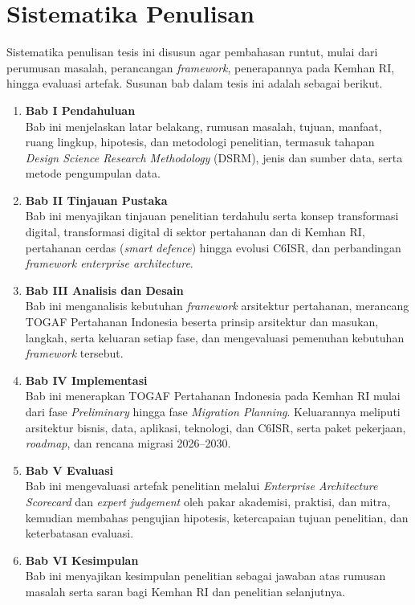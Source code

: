 \section{Sistematika Penulisan}
Sistematika penulisan tesis ini disusun agar pembahasan runtut, mulai dari perumusan masalah, perancangan \textit{framework}, penerapannya pada Kemhan RI, hingga evaluasi artefak.
Susunan bab dalam tesis ini adalah sebagai berikut.
\begin{enumerate}
\item \textbf{Bab I Pendahuluan}\\
Bab ini menjelaskan latar belakang, rumusan masalah, tujuan, manfaat, ruang lingkup, hipotesis, dan metodologi penelitian, termasuk tahapan \textit{Design Science Research Methodology} (DSRM), jenis dan sumber data, serta metode pengumpulan data.
\item \textbf{Bab II Tinjauan Pustaka}\\
Bab ini menyajikan tinjauan penelitian terdahulu serta konsep transformasi digital, transformasi digital di sektor pertahanan dan di Kemhan RI, pertahanan cerdas (\textit{smart defence}) hingga evolusi C6ISR, dan perbandingan \textit{framework enterprise architecture}.
\item \textbf{Bab III Analisis dan Desain}\\
Bab ini menganalisis kebutuhan \textit{framework} arsitektur pertahanan, merancang TOGAF Pertahanan Indonesia beserta prinsip arsitektur dan masukan, langkah, serta keluaran setiap fase, dan mengevaluasi pemenuhan kebutuhan \textit{framework} tersebut.
\item \textbf{Bab IV Implementasi}\\
Bab ini menerapkan TOGAF Pertahanan Indonesia pada Kemhan RI mulai dari fase \textit{Preliminary} hingga fase \textit{Migration Planning}.
Keluarannya meliputi arsitektur bisnis, data, aplikasi, teknologi, dan C6ISR, serta paket pekerjaan, \textit{roadmap}, dan rencana migrasi 2026--2030.
\item \textbf{Bab V Evaluasi}\\
Bab ini mengevaluasi artefak penelitian melalui \textit{Enterprise Architecture Scorecard} dan \textit{expert judgement} oleh pakar akademisi, praktisi, dan mitra, kemudian membahas pengujian hipotesis, ketercapaian tujuan penelitian, dan keterbatasan evaluasi.
\item \textbf{Bab VI Kesimpulan}\\
Bab ini menyajikan kesimpulan penelitian sebagai jawaban atas rumusan masalah serta saran bagi Kemhan RI dan penelitian selanjutnya.
\end{enumerate}
